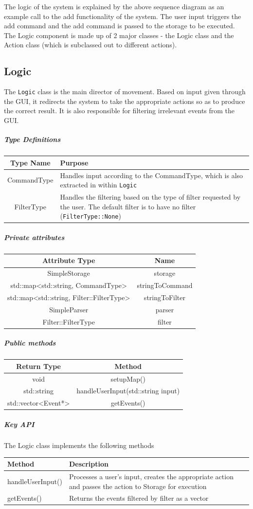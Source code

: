 \documentclass[12pt]{extarticle}
\begin{document}
The logic of the system is explained by the above sequence diagram as an example call to the add functionality of the system. The user input triggers the add command and the add command is passed to the storage to be executed.\\
The Logic component is made up of 2 major classes - the Logic class and the Action class (which is subclassed out to different actions).

\subsection{Logic}
The \texttt{Logic} class is the main director of movement. Based on input given through the GUI, it redirects the system to take the appropriate actions so as to produce the correct result. It is also responsible for filtering irrelevant events from the GUI.
\subparagraph{Type Definitions}
\begin{tabular}{c p{9.5cm}}
Type Name & Purpose\\
\hline
CommandType & Handles input according to the CommandType, which is also extracted in within \texttt{Logic}\\
FilterType & Handles the filtering based on the type of filter requested by the user. The default filter is to have no filter (\texttt{FilterType::None})
\end{tabular}
\subparagraph{Private attributes}
\begin{tabular}{c c}
Attribute Type & Name\\
\hline
SimpleStorage & storage\\
std::map<std::string, CommandType> & stringToCommand\\
std::map<std::string, Filter::FilterType> & stringToFilter\\
SimpleParser & parser\\
Filter::FilterType & filter\\
\end{tabular}
\subparagraph{Public methods}
\begin{tabular}{c c}
Return Type & Method\\
\hline
void & setupMap()\\
std::string & handleUserInput(std::string input)\\
std::vector<Event*> & getEvents()\\
\end{tabular}
\subparagraph{Key API}
The Logic class implements the following methods\\
\begin{tabular}{p{6cm} p{12cm}}
Method & Description\\
\hline
handleUserInput() & Processes a user's input, creates the appropriate action and passes the action to Storage for execution\\
getEvents() & Returns the events filtered by filter as a vector\\
\end{tabular}
\end{document}
